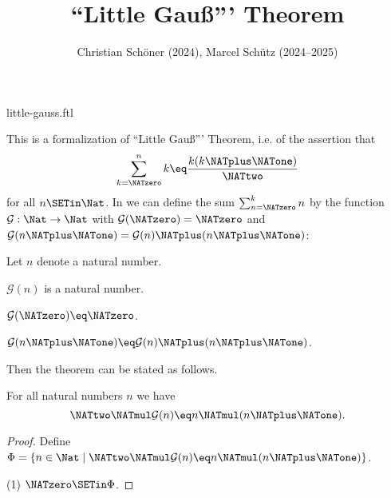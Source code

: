 \documentclass{article}
\title{``Little Gauß''' Theorem}
\author{Christian Schöner (2024), Marcel Schütz (2024--2025)}
\date{}
\newcommand{\gauss}{\mathcal{G}}
\begin{document}
\begin{smodule}{little-gauss.ftl}
\maketitle


\noindent This is a formalization of ``Little Gauß''' Theorem, i.e. of
the assertion that
\[\sum_{k = \NATzero}^n k \eq \frac{k(k \NATplus \NATone)}\NATtwo\]
for all $n \SETin \Nat$.
In \Naproche we can define the sum $\sum_{n = \NATzero}^k n$ by the function
$\gauss : \Nat \to \Nat$ with $\gauss(\NATzero) = \NATzero$ and
$\gauss(n \NATplus \NATone) = \gauss(n) \NATplus (n \NATplus \NATone)$:

\begin{forthel}
  Let $n$ denote a natural number.

  \begin{signature*}
    $\gauss(n)$ is a natural number.
  \end{signature*}

  \begin{axiom*}
    $\gauss(\NATzero) \eq \NATzero$.
  \end{axiom*}

  \begin{axiom*}
    $\gauss(n \NATplus \NATone) \eq \gauss(n) \NATplus (n \NATplus \NATone)$.
  \end{axiom*}
\end{forthel}

\noindent Then the theorem can be stated as follows.

\begin{forthel}
  \begin{theorem*}[title=Little Gauß,id=little_gauss]
    For all natural numbers $n$ we have
    \[\NATtwo \NATmul \gauss(n) \eq n \NATmul (n \NATplus \NATone).\]
  \end{theorem*}
  \begin{proof}
    Define $\Phi = \{ n \in \Nat \mid \NATtwo \NATmul \gauss(n) \eq n \NATmul (n \NATplus \NATone) \}$.
    
    (1) $\NATzero \SETin \Phi$.


\end{proof}
\end{forthel}
\end{smodule}
\end{document}
